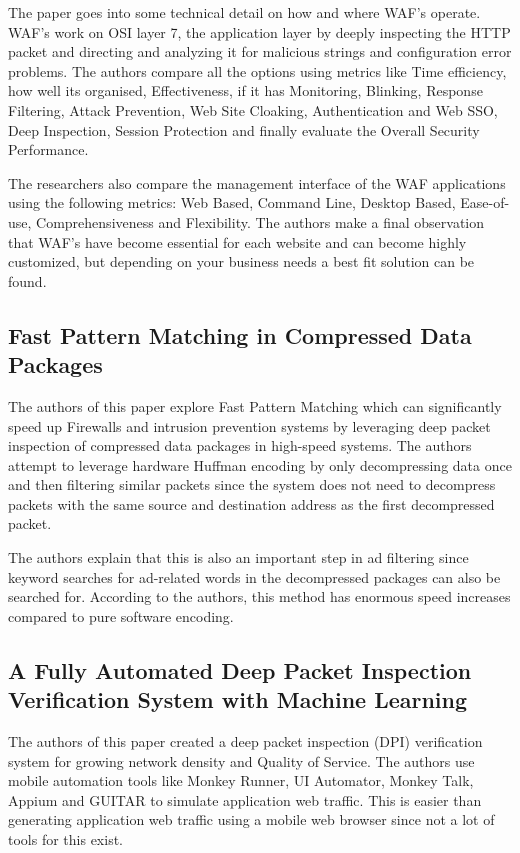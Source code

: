 \documentclass[a4paper, onecolumn, 12pt]{IEEEtran}
\begin{document}
    The paper goes into some technical detail on how and where WAF's operate. WAF's work on OSI layer 7, the application layer by deeply inspecting the HTTP packet and directing and analyzing it for malicious strings and configuration error problems. The authors compare all the options using metrics like Time efficiency, how well its organised, Effectiveness, if it has Monitoring, Blinking, Response Filtering, Attack Prevention, Web Site Cloaking, Authentication and Web SSO, Deep Inspection, Session Protection and finally evaluate the Overall Security Performance.

    The researchers also compare the management interface of the WAF applications using the following metrics: Web Based, Command Line, Desktop Based, Ease-of-use, Comprehensiveness and Flexibility. The authors make a final observation that WAF's have become essential for each website and can become highly customized, but depending on your business needs a best fit solution can be found.


\subsection{Fast Pattern Matching in Compressed Data Packages \cite{5700208}}
The authors of this paper explore Fast Pattern Matching which can significantly speed up Firewalls and intrusion prevention systems by leveraging deep packet inspection of compressed data packages in high-speed systems. The authors attempt to leverage hardware Huffman encoding by only decompressing data once and then filtering similar packets since the system does not need to decompress packets with the same source and destination address as the first decompressed packet.

The authors explain that this is also an important step in ad filtering since keyword searches for ad-related words in the decompressed packages can also be searched for. According to the authors, this method has enormous speed increases compared to pure software encoding.


\subsection{A Fully Automated Deep Packet Inspection Verification System with Machine Learning \cite{7947802}}
The authors of this paper created a deep packet inspection (DPI) verification system for growing network density and Quality of Service. The authors use mobile automation tools like Monkey Runner, UI Automator, Monkey Talk, Appium and GUITAR to simulate application web traffic. This is easier than generating application web traffic using a mobile web browser since not a lot of tools for this exist.
\end{document}
